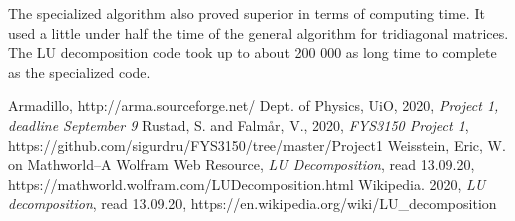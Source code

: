 \documentclass[reprint, english,notitlepage]{revtex4-1}  %
\begin{document}
The specialized algorithm also proved superior in terms of computing time. It used a little under half the time of the general algorithm for tridiagonal matrices. The LU decomposition code took up to about 200 000 as long time to complete as the specialized code.



\onecolumngrid
\vspace{1cm} %
\newpage

\begin{thebibliography}{}
   Armadillo, http://arma.sourceforge.net/
   Dept. of Physics, UiO,  2020, \textit{Project 1, deadline September 9}
   Rustad, S. and Falmår, V.,  2020, \textit{FYS3150 Project 1}, https://github.com/sigurdru/FYS3150/tree/master/Project1
   Weisstein, Eric, W. on Mathworld--A Wolfram Web Resource, \textit{LU Decomposition}, read 13.09.20, https://mathworld.wolfram.com/LUDecomposition.html
   Wikipedia.  2020, \textit{LU decomposition}, read 13.09.20, https://en.wikipedia.org/wiki/LU\_decomposition
\end{thebibliography}
\end{document}
